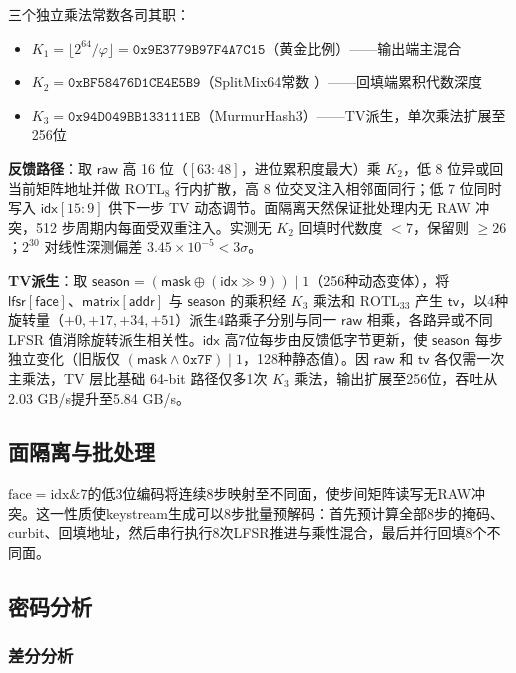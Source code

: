 \documentclass[11pt,a4paper]{ctexart}
\begin{document}
三个独立乘法常数各司其职：

\begin{itemize}
\item $K_1 = \lfloor 2^{64}/\varphi \rfloor = \mathtt{0x9E3779B97F4A7C15}$（黄金比例）——输出端主混合
\item $K_2 = \mathtt{0xBF58476D1CE4E5B9}$（SplitMix64常数 \cite{splitmix}）——回填端累积代数深度
\item $K_3 = \mathtt{0x94D049BB133111EB}$（MurmurHash3）——TV派生，单次乘法扩展至256位
\end{itemize}

\textbf{反馈路径}：取 $\mathsf{raw}$ 高 16 位（$[63:48]$，进位累积度最大）乘 $K_2$，低 8 位异或回当前矩阵地址并做 $\mathrm{ROTL}_8$ 行内扩散，高 8 位交叉注入相邻面同行；低 7 位同时写入 $\mathsf{idx}[15:9]$ 供下一步 TV 动态调节。面隔离天然保证批处理内无 RAW 冲突，512 步周期内每面受双重注入。实测无 $K_2$ 回填时代数度 $<7$，保留则 $\ge 26$；$2^{30}$ 对线性深测偏差 $3.45\times10^{-5} < 3\sigma$。

\textbf{TV派生}：取 $\mathsf{season} = (\mathsf{mask} \oplus (\mathsf{idx} \gg 9)) \mid 1$（256种动态变体），将 $\mathsf{lfsr}[\mathsf{face}]$、$\mathsf{matrix}[\mathsf{addr}]$ 与 $\mathsf{season}$ 的乘积经 $K_3$ 乘法和 $\mathrm{ROTL}_{33}$ 产生 $\mathsf{tv}$，以4种旋转量（$+0, +17, +34, +51$）派生4路乘子分别与同一 $\mathsf{raw}$ 相乘，各路异或不同 LFSR 值消除旋转派生相关性。$\mathsf{idx}$ 高7位每步由反馈低字节更新，使 $\mathsf{season}$ 每步独立变化（旧版仅 $( \mathsf{mask} \land \mathtt{0x7F}) \mid 1$，128种静态值）。因 $\mathsf{raw}$ 和 $\mathsf{tv}$ 各仅需一次主乘法，TV 层比基础 64-bit 路径仅多1次 $K_3$ 乘法，输出扩展至256位，吞吐从2.03 GB/s提升至5.84 GB/s。

\subsection{面隔离与批处理}

$\mathrm{face} = \mathrm{idx} \mathbin{\&} 7$的低3位编码将连续8步映射至不同面，使步间矩阵读写无RAW冲突。这一性质使keystream生成可以8步批量预解码：首先预计算全部8步的掩码、curbit、回填地址，然后串行执行8次LFSR推进与乘性混合，最后并行回填8个不同面。

\subsection{密码分析}

\subsubsection{差分分析}
\end{document}
